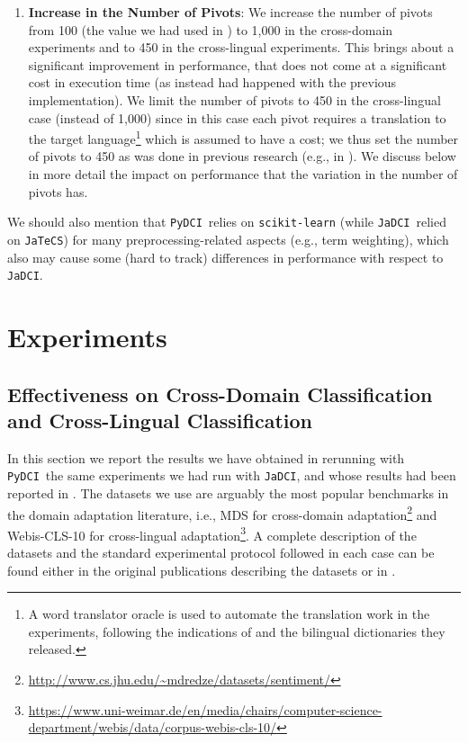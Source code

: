 \documentclass{article}
\newif\ifdraft
\newcommand{\fabscomment}[1]{\ifdraft{\leavevmode\color{cyan}[FS]: {#1}}\else{\vspace{0ex}}\fi}
\newcommand{\jadci}{\texttt{JaDCI}}
\newcommand{\pydci}{\texttt{PyDCI}}
\begin{document}
\begin{enumerate}
\item \label{item:pivots} \textbf{Increase in the Number of Pivots}:
  We increase the number of pivots from 100 (the value we had used in
  \citep{Moreo:2016fg}) to 1,000 in the cross-domain experiments and
  to 450 in the cross-lingual experiments. This brings about a
  significant improvement in performance, that does not come at a
  significant cost in execution time (as instead had happened with the
  previous implementation).  We limit the number of pivots to 450 in
  the cross-lingual case (instead of 1,000) since in this case each
  pivot requires a translation to the target language\footnote{A word
  translator oracle is used to automate the translation work in the
  experiments, following the indications of
  \citep{Prettenhofer:2010ys} and the bilingual dictionaries they
  released.} which is assumed to have a cost; we thus set the number
  of pivots to 450 as was done in previous research (e.g., in
  \citep{Prettenhofer:2010ys}). We discuss below in more detail the
  impact on performance that the variation in the number of pivots
  has.

\end{enumerate}

\noindent We should also mention that \pydci\ relies on
\texttt{scikit-learn} (while \jadci\ relied on \texttt{JaTeCS}) for
many preprocessing-related aspects (e.g., term weighting), which also
may cause some (hard to track) differences in performance with respect
to \jadci.


\section{Experiments}
\label{sec:results}


\subsection{Effectiveness on Cross-Domain Classification and
Cross-Lingual Classification}
\label{sec:effectiveness}

\noindent In this section we report the results we have obtained in
rerunning with \pydci\ the same experiments we had run with \jadci,
and whose results had been reported in \citep{Moreo:2016fg}.  The
datasets we use are arguably the most popular benchmarks in the domain
adaptation literature, i.e., MDS \citep{Blitzer:2007gf} for
cross-domain
adaptation\footnote{\url{http://www.cs.jhu.edu/~mdredze/datasets/sentiment/}}
and Webis-CLS-10 \citep{Prettenhofer:2010ys} for cross-lingual
adaptation\footnote{\url{https://www.uni-weimar.de/en/media/chairs/computer-science-department/webis/data/corpus-webis-cls-10/}}.
A complete description of the datasets and the standard experimental
protocol followed in each case can be found either in the original
publications describing the datasets
\citep{Blitzer:2007gf,Prettenhofer:2010ys} or in \citep{Moreo:2016fg}.
\end{document}
